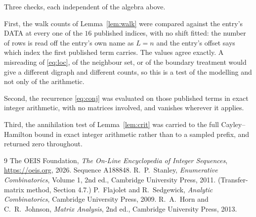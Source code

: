 \documentclass[11pt,a4paper]{article}
\theoremstyle{plain}
\theoremstyle{definition}
\begin{document}
Three checks, each independent of the algebra above.

First, the walk counts of Lemma~\ref{lem:walk} were compared against the entry's DATA at
every one of the $16$ published indices, with no shift fitted: the number of rows is
read off the entry's own name as $L=n$ and the entry's offset says which index the first
published term carries. The values agree exactly. A misreading of \eqref{eq:loc}, of the
neighbour set, or of the boundary treatment would give a different digraph and different
counts, so this is a test of the modelling and not only of the arithmetic.

Second, the recurrence \eqref{eq:conj} was evaluated on those published terms in exact
integer arithmetic, with no matrices involved, and vanishes wherever it applies.

Third, the annihilation test of Lemma~\ref{lem:crit} was carried to the full
Cayley--Hamilton bound in exact integer arithmetic rather than to a sampled prefix, and
returned zero throughout.

\begin{thebibliography}{9}
 The OEIS Foundation, \emph{The On-Line Encyclopedia of Integer
Sequences}, \url{https://oeis.org}, 2026. Sequence A188848.
 R.~P.~Stanley, \emph{Enumerative Combinatorics}, Volume 1, 2nd ed.,
Cambridge University Press, 2011. (Transfer-matrix method, Section 4.7.)
 P.~Flajolet and R.~Sedgewick, \emph{Analytic Combinatorics}, Cambridge
University Press, 2009.
 R.~A.~Horn and C.~R.~Johnson, \emph{Matrix Analysis}, 2nd ed., Cambridge
University Press, 2013.
\end{thebibliography}
\end{document}
